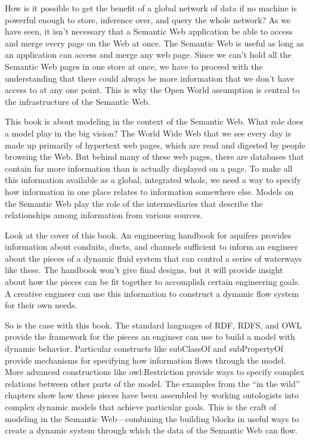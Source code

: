 How is it possible to get the benefit of a global network of data if no
machine is powerful enough to
store, inference over, and query the whole network? As we have seen, it
isn't necessary that a Semantic Web application be able to access and
merge every page on the Web at once. The Semantic Web is useful as long
as an application can access and merge any web page. Since we can't hold
all the Semantic Web pages in one store at once, we have to proceed with
the understanding that there could always be more information that we
don't have access to at any one point. This is why the Open World
assumption is central to the infrastructure of the Semantic Web.

This book is about modeling in the context of the Semantic Web. What
role does a model play in the big vision? The World Wide Web that we see
every day is made up primarily of hypertext web pages, which are read and digested
by people browsing the Web. But behind many of these web pages, there
are databases that contain far more information than is actually
displayed on a page. To make all this information available as a global,
integrated whole, we need a way to specify how information in one place
relates to information somewhere else. Models on the Semantic Web play
the role of the intermediaries that describe the relationships among
information from various sources.

Look at the cover of this book. An engineering handbook for aquifers
provides information about conduits, ducts, and channels sufficient to
inform an engineer about the pieces of a dynamic fluid system that can
control a series of waterways like these. The handbook won't give final
designs, but it will provide insight about how the pieces can be fit
together to accomplish certain engineering goals. A creative engineer
can use this information to construct a dynamic flow system for their own
needs.

So is the case with this book. The standard languages of RDF, RDFS, and
OWL provide the framework for the pieces an engineer can use to build a
model with dynamic behavior. Particular constructs like subClassOf and
subPropertyOf provide mechanisms for specifying how information flows
through the model. More advanced constructions like owl:Restriction
provide ways to specify complex relations between other parts of the
model. The examples from the ``in the wild'' chapters show how these
pieces have been assembled by working ontologists into complex dynamic
models that achieve particular goals. This is the craft of modeling in
the Semantic Web---combining the building blocks in useful ways to
create a dynamic system through which the data of the Semantic Web can
flow.

